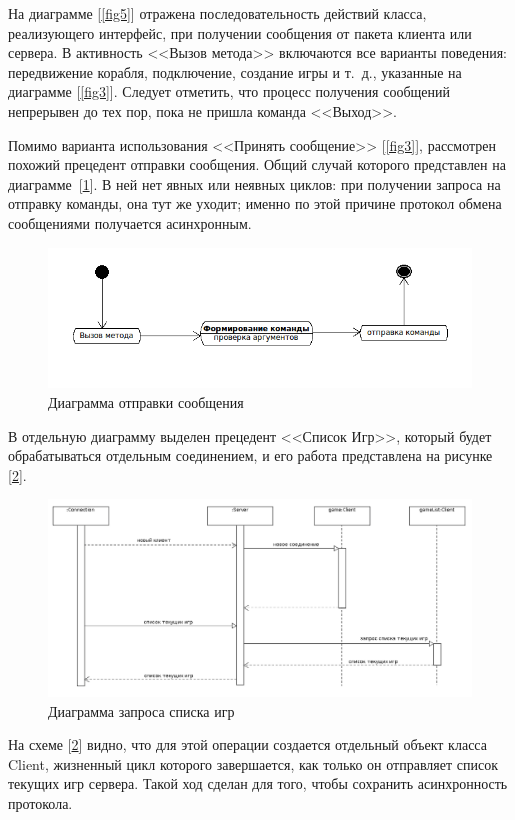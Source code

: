 На диаграмме [\ref{fig5}] отражена последовательность действий класса, реализующего интерфейс, при получении сообщения от пакета клиента или сервера. В активность <<Вызов метода>> включаются все варианты поведения: передвижение корабля, подключение, создание игры и т.~д., указанные на диаграмме  [\ref{fig3}]. Следует отметить, что процесс получения сообщений непрерывен до тех пор, пока не пришла команда <<Выход>>.

Помимо варианта использования <<Принять сообщение>> [\ref{fig3}], рассмотрен похожий прецедент отправки сообщения. Общий случай которого представлен  на диаграмме~[\ref{fig6}]. В ней нет явных или неявных циклов: при получении  запроса на отправку команды, она тут же уходит; именно по этой причине протокол обмена сообщениями получается асинхронным. 
\begin{figure}[ht]
\centering
\includegraphics[width=18cm]{images/state1.png}
\caption{Диаграмма отправки сообщения}
\label{fig6}
\end{figure}

В отдельную диаграмму выделен прецедент <<Список Игр>>, который будет обрабатываться отдельным соединением, и его работа представлена на рисунке [\ref{fig7}]. 

\begin{figure}[ht]
\centering
\includegraphics[width=16cm]{images/par2.png}
\caption{Диаграмма запроса списка игр}
\label{fig7}
\end{figure}

На схеме [\ref{fig7}] видно, что для этой операции создается отдельный объект класса Client, жизненный цикл которого завершается, как только он отправляет список текущих игр сервера. Такой ход сделан для того, чтобы сохранить асинхронность протокола.

\endinput
